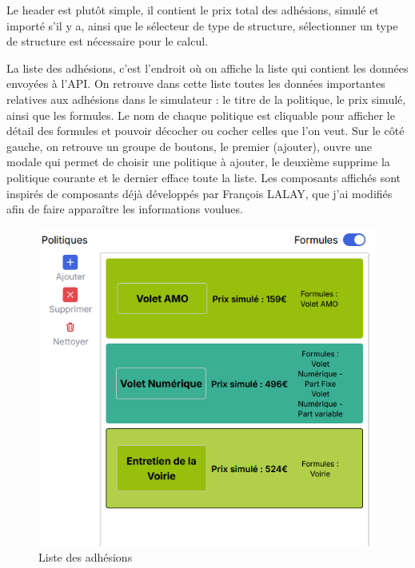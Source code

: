 \documentclass[a4paper,12pt]{report}
\begin{document}
\vspace{1em}

Le header est plutôt simple, il contient le prix total des adhésions, simulé et importé s'il y a, ainsi que le sélecteur de type de structure, sélectionner un type de structure est nécessaire pour le calcul.

\vspace{1em}

La liste des adhésions, c'est l'endroit où on affiche la liste qui contient les données envoyées à l'API. On retrouve dans cette liste toutes les données importantes relatives aux adhésions dans le simulateur : le titre de la politique, le prix simulé, ainsi que les formules. Le nom de chaque politique est cliquable pour afficher le détail des formules et pouvoir décocher ou cocher celles que l'on veut. Sur le côté gauche, on retrouve un groupe de boutons, le premier (ajouter), ouvre une modale qui permet de choisir une politique à ajouter, le deuxième supprime la politique courante et le dernier efface toute la liste. Les composants affichés sont inspirés de composants déjà développés par François LALAY, que j'ai modifiés afin de faire apparaître les informations voulues.

\begin{figure}[H]
    \centering
    \includegraphics[scale=0.5]{adhesionList.png}
    \caption{Liste des adhésions}
    \label{fig:list-adhe}
\end{figure}
\end{document}
